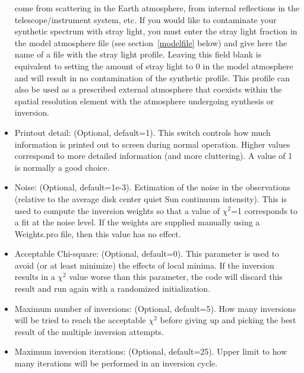 \begin{itemize}
  come from scattering in the Earth atmosphere, from internal
  reflections in the telescope/instrument system, etc. If you would
  like to contaminate your synthetic spectrum with stray light, you
  must enter the stray light fraction in the model atmosphere file
  (see section~\ref{modelfile} below) and give here the name of a file
  with the stray light profile.  Leaving this field blank is
  equivalent to setting the amount of stray light to 0 in the model
  atmosphere and will result in no contamination of the synthetic
  profile. This profile can also be used as a prescribed external
  atmosphere that coexists within the spatial resolution element with
  the atmosphere undergoing synthesis or inversion. 
\item Printout detail: (Optional, default=1). This switch controls how
  much information is printed out to screen during normal
  operation. Higher values correspond to more detailed information
  (and more cluttering).  A value of 1 is normally a good choice.
\item Noise: (Optional, default=1e-3). Estimation of the noise in the
  observations (relative to the average disk center quiet Sun
  continuum intensity). This is used to compute the inversion weights
  so that a value of $\chi^2$=1 corresponds to a fit at the noise
  level. If the weights are supplied manually using a Weights.pro
  file, then this value has no effect.
\item Acceptable Chi-square: (Optional, default=0). This parameter is
  used to avoid (or at least minimize) the effects of local minima. If
  the inversion results in a $\chi^2$ value worse than this parameter,
  the code will discard this result and run again with a randomized
  initialization.
\item Maximum number of inversions: (Optional, default=5). How many
  inversions will be tried to reach the acceptable $\chi^2$ before
  giving up and picking the best result of the multiple inversion
  attempts.
\item Maximum inversion iterations: (Optional, default=25). Upper
  limit to how many iterations will be performed in an inversion
  cycle.

\end{itemize}
